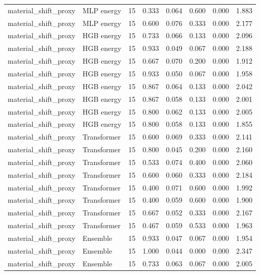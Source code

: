 {\begin{longtable}{llrrrrrr}
material\_shift\_proxy & MLP energy & 15 & 0.333 & 0.064 & 0.600 & 0.000 & 1.883 \\
material\_shift\_proxy & MLP energy & 15 & 0.600 & 0.076 & 0.333 & 0.000 & 2.177 \\
material\_shift\_proxy & HGB energy & 15 & 0.733 & 0.066 & 0.133 & 0.000 & 2.096 \\
material\_shift\_proxy & HGB energy & 15 & 0.933 & 0.049 & 0.067 & 0.000 & 2.188 \\
material\_shift\_proxy & HGB energy & 15 & 0.667 & 0.070 & 0.200 & 0.000 & 1.912 \\
material\_shift\_proxy & HGB energy & 15 & 0.933 & 0.050 & 0.067 & 0.000 & 1.958 \\
material\_shift\_proxy & HGB energy & 15 & 0.867 & 0.064 & 0.133 & 0.000 & 2.042 \\
material\_shift\_proxy & HGB energy & 15 & 0.867 & 0.058 & 0.133 & 0.000 & 2.001 \\
material\_shift\_proxy & HGB energy & 15 & 0.800 & 0.062 & 0.133 & 0.000 & 2.005 \\
material\_shift\_proxy & HGB energy & 15 & 0.800 & 0.058 & 0.133 & 0.000 & 1.855 \\
material\_shift\_proxy & Transformer & 15 & 0.600 & 0.069 & 0.333 & 0.000 & 2.141 \\
material\_shift\_proxy & Transformer & 15 & 0.800 & 0.045 & 0.200 & 0.000 & 2.160 \\
material\_shift\_proxy & Transformer & 15 & 0.533 & 0.074 & 0.400 & 0.000 & 2.060 \\
material\_shift\_proxy & Transformer & 15 & 0.600 & 0.060 & 0.333 & 0.000 & 2.184 \\
material\_shift\_proxy & Transformer & 15 & 0.400 & 0.071 & 0.600 & 0.000 & 1.992 \\
material\_shift\_proxy & Transformer & 15 & 0.400 & 0.059 & 0.600 & 0.000 & 1.900 \\
material\_shift\_proxy & Transformer & 15 & 0.667 & 0.052 & 0.333 & 0.000 & 2.167 \\
material\_shift\_proxy & Transformer & 15 & 0.467 & 0.059 & 0.533 & 0.000 & 1.963 \\
material\_shift\_proxy & Ensemble & 15 & 0.933 & 0.047 & 0.067 & 0.000 & 1.954 \\
material\_shift\_proxy & Ensemble & 15 & 1.000 & 0.044 & 0.000 & 0.000 & 2.347 \\
material\_shift\_proxy & Ensemble & 15 & 0.733 & 0.063 & 0.067 & 0.000 & 2.005 \\

\end{longtable}}
